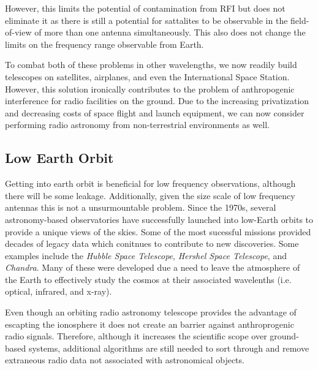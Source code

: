 However, this limits the potential of contamination from RFI but does not eliminate it as there is still a potential for sattalites to be observable in the field-of-view of more than one antenna simultaneously. This also does not change the limits on the frequency range observable from Earth.  

To combat both of these problems in other wavelengths, we now readily build telescopes on satellites, airplanes, and even the International Space Station. However, this solution ironically contributes to the problem of anthropogenic interference for radio facilities on the ground. Due to the increasing privatization and decreasing costs of space flight and launch equipment, we can now consider performing radio astronomy from non-terrestrial environments as well.



\subsection{Low Earth Orbit}
Getting into earth orbit is beneficial for low frequency observations, although there will be some leakage.  Additionally, given the size scale of low frequency antennas this is not a unsurmountable problem. Since the 1970s, several astronomy-based observatories have successfully launched into low-Earth orbits to provide a unique views of the skies. Some of the most sucessful missions provided decades of legacy data which conitnues to contribute to new discoveries. Some examples include the \textit{Hubble Space Telescope}, \textit{Hershel Space Telescope}, and \textit{Chandra}. Many of these were developed due a need to leave the atmosphere of the Earth to effectively study the cosmos at their associated wavelenths (i.e. optical, infrared, and x-ray). 

Even though an orbiting radio astronomy telescope provides the advantage of escapting the ionosphere it does not create an barrier against anthroprogenic radio signals. Therefore, although it increases the scientific scope over ground-based systems, additional algorithms are still needed to sort through and remove extraneous radio data not associated with astronomical objects.

